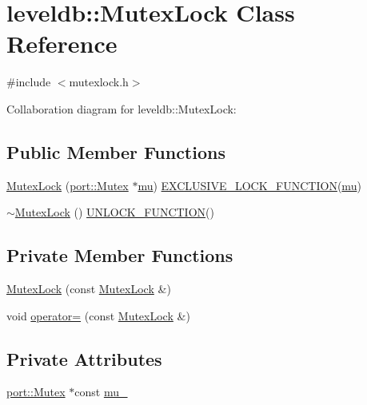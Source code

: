 \hypertarget{classleveldb_1_1_mutex_lock}{\section{leveldb\-:\-:Mutex\-Lock Class Reference}
\label{classleveldb_1_1_mutex_lock}
}


{\ttfamily \#include $<$mutexlock.\-h$>$}



Collaboration diagram for leveldb\-:\-:Mutex\-Lock\-:
\subsection*{Public Member Functions}
\begin{DoxyCompactItemize}
\item 
\hyperlink{classleveldb_1_1_mutex_lock_a1501eaa9a404460e06d47468e0e04ef2}{Mutex\-Lock} (\hyperlink{classleveldb_1_1port_1_1_mutex}{port\-::\-Mutex} $\ast$\hyperlink{db__impl_8cc_a900dad9ea326bf70a183d88a8ab50a13}{mu}) \hyperlink{thread__annotations_8h_a77729163b7f6867da40ad5daa5f926f3}{E\-X\-C\-L\-U\-S\-I\-V\-E\-\_\-\-L\-O\-C\-K\-\_\-\-F\-U\-N\-C\-T\-I\-O\-N}(\hyperlink{db__impl_8cc_a900dad9ea326bf70a183d88a8ab50a13}{mu})
\item 
\hyperlink{classleveldb_1_1_mutex_lock_ad8ee2ca0a48e81adfb4b97d438a34065}{$\sim$\-Mutex\-Lock} () \hyperlink{thread__annotations_8h_abd56e19f9b4781b1a5212a46951cf5c3}{U\-N\-L\-O\-C\-K\-\_\-\-F\-U\-N\-C\-T\-I\-O\-N}()
\end{DoxyCompactItemize}
\subsection*{Private Member Functions}
\begin{DoxyCompactItemize}
\item 
\hyperlink{classleveldb_1_1_mutex_lock_a3699b399e5a1fa20998616b389b5a53a}{Mutex\-Lock} (const \hyperlink{classleveldb_1_1_mutex_lock}{Mutex\-Lock} \&)
\item 
void \hyperlink{classleveldb_1_1_mutex_lock_a2adaf9ac4627433eb9ff0786da631d4d}{operator=} (const \hyperlink{classleveldb_1_1_mutex_lock}{Mutex\-Lock} \&)
\end{DoxyCompactItemize}
\subsection*{Private Attributes}
\begin{DoxyCompactItemize}
\item 
\hyperlink{classleveldb_1_1port_1_1_mutex}{port\-::\-Mutex} $\ast$const \hyperlink{classleveldb_1_1_mutex_lock_a74543abf2242ae89ba8cc03a86922565}{mu\-\_\-}
\end{DoxyCompactItemize}


